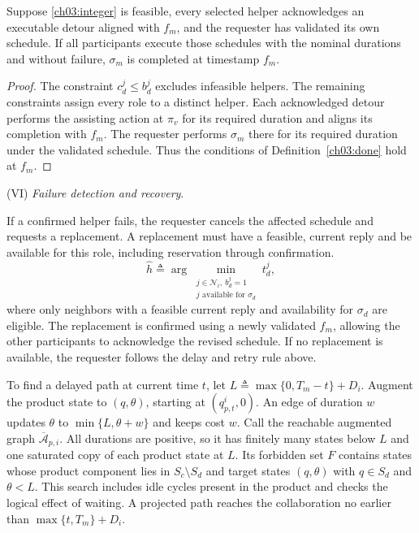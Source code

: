 \begin{revision}
\begin{theorem}
\label{ch03:tm}
Suppose \eqref{ch03:integer} is feasible, every selected helper acknowledges
an executable detour aligned with $f_m$, and the requester has validated its
own schedule. If all participants execute those schedules with the nominal
durations and without failure, $\sigma_m$ is completed at timestamp $f_m$.
\end{theorem}

\begin{proof}
The constraint $c_d^j\le b_d^j$ excludes infeasible helpers. The remaining
constraints assign every role to a distinct helper. Each acknowledged detour
performs the assisting action at $\pi_v$ for its required duration and
aligns its completion with $f_m$. The requester performs $\sigma_m$ there
for its required duration under the validated schedule. Thus the conditions
of Definition~\ref{ch03:done} hold at $f_m$.
\end{proof}
\end{revision}

(VI) \emph{Failure detection and recovery}.
\begin{revision}
If a confirmed helper fails, the requester cancels the affected schedule and
requests a replacement. A replacement must have a feasible, current reply and
be available for this role, including reservation through confirmation.
\begin{equation}
\label{ch03:eq:reassign}
\hat{h}\triangleq\arg\min_{\substack{j\in\mathcal{N}_i,\ b_d^j=1\\
j\text{ available for }\sigma_d}}t_d^j,
\end{equation}
where only neighbors with a feasible current reply and availability for
$\sigma_d$ are eligible. The replacement is confirmed using a newly validated
$f_m$, allowing the other participants to acknowledge the revised schedule. If no replacement is
available, the requester follows the delay and retry rule above.
\end{revision}

\begin{revision}
To find a delayed path at current time $t$, let
$L\triangleq\max\{0,T_m-t\}+D_i$.
Augment the product state to $(q,\theta)$, starting at $(q_{p,t}^i,0)$.
An edge of duration $w$ updates $\theta$ to $\min\{L,\theta+w\}$ and keeps
cost $w$. Call the reachable augmented graph $\overline{\mathcal{A}}_{p,i}$.
All durations are positive, so it has finitely many states below $L$ and
one saturated copy of each product state at $L$. Its forbidden set $F$
contains states whose product component lies in $S_c\setminus S_d$ and
target states $(q,\theta)$ with $q\in S_d$ and $\theta<L$.
This search includes idle cycles present in the product and checks the
logical effect of waiting. A projected path reaches the collaboration
no earlier than $\max\{t,T_m\}+D_i$.
\end{revision}

